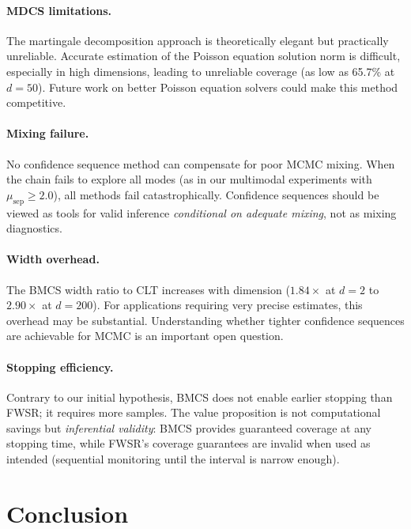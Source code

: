 \documentclass[11pt]{article}
\begin{document}
\paragraph{MDCS limitations.} The martingale decomposition approach is theoretically elegant but practically unreliable. Accurate estimation of the Poisson equation solution norm is difficult, especially in high dimensions, leading to unreliable coverage (as low as 65.7\% at $d=50$). Future work on better Poisson equation solvers could make this method competitive.

\paragraph{Mixing failure.} No confidence sequence method can compensate for poor MCMC mixing. When the chain fails to explore all modes (as in our multimodal experiments with $\mu_{\text{sep}} \geq 2.0$), all methods fail catastrophically. Confidence sequences should be viewed as tools for valid inference \emph{conditional on adequate mixing}, not as mixing diagnostics.

\paragraph{Width overhead.} The BMCS width ratio to CLT increases with dimension ($1.84\times$ at $d=2$ to $2.90\times$ at $d=200$). For applications requiring very precise estimates, this overhead may be substantial. Understanding whether tighter confidence sequences are achievable for MCMC is an important open question.

\paragraph{Stopping efficiency.} Contrary to our initial hypothesis, BMCS does not enable earlier stopping than FWSR; it requires more samples. The value proposition is not computational savings but \emph{inferential validity}: BMCS provides guaranteed coverage at any stopping time, while FWSR's coverage guarantees are invalid when used as intended (sequential monitoring until the interval is narrow enough).

\section{Conclusion}
\end{document}
